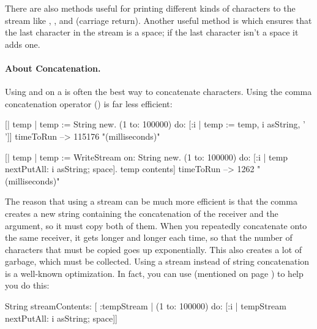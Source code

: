 \documentclass[a4paper,10pt,twoside]{book}
\begin{document}
There are also methods useful for printing different kinds of characters to the stream like , , and  (carriage return).
Another useful method is  which ensures that the last character in the stream is a space; if the last character isn't a space it adds one.

\paragraph{About Concatenation.}
Using  and  on a  is often the best way to concatenate characters.
Using the comma concatenation operator (\ct{,}) is far less efficient:

\begin{code}{}
[| temp |
  temp := String new.
  (1 to: 100000)
    do: [:i | temp := temp, i asString, ' ']] timeToRun --> 115176 "(milliseconds)"

[| temp |
  temp := WriteStream on: String new.
  (1 to: 100000)
    do: [:i | temp nextPutAll: i asString; space].
  temp contents] timeToRun --> 1262 "(milliseconds)"
\end{code}

The reason that using a stream can be much more efficient is that the comma creates a new string containing the concatenation of the receiver and the argument, so it must copy both of them.
When you repeatedly concatenate onto the same receiver, it gets longer and longer each time, so that the number of characters that must be copied goes up exponentially.
This also creates a lot of garbage, which must be collected.
Using a stream instead of string concatenation is a well-known optimization.
In fact, you can use  (mentioned on page \pageref{sec:streamContents}) to help you do this:

\begin{code}{}
String streamContents: [ :tempStream |
  (1 to: 100000)
       do: [:i | tempStream nextPutAll: i asString; space]] 
\end{code}

\end{document}
